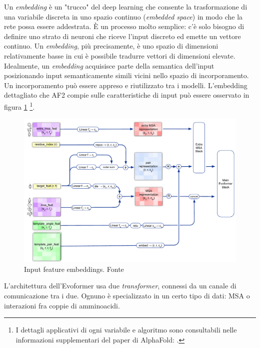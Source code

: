 \par Un \textit{embedding} è un "trucco" del deep learning che consente la trasformazione di una variabile discreta in uno spazio continuo (\textit{embedded space}) in modo che la rete possa essere addestrata. È un processo molto semplice: c'è solo bisogno di definire uno strato di neuroni che riceve l'input discreto ed emette un vettore continuo. Un \textit{embedding}, più precisamente, è uno spazio di dimensioni relativamente basse in cui è possibile tradurre vettori di dimensioni elevate.  Idealmente, un \textit{embedding} acquisisce parte della semantica dell'input posizionando input semanticamente simili vicini nello spazio di incorporamento.  Un incorporamento può essere appreso e riutilizzato tra i modelli. L'embedding dettagliato che AF2 compie sulle caratteristiche di input può essere osservato in figura \ref{fig:af2-emebddings} \footnote{I dettagli applicativi di ogni variabile e algoritmo sono consultabili nelle informazioni supplementari del paper di AlphaFold: .}.

\begin{figure}[!htb]
	\centering
	\includegraphics[scale=0.46]{images/af2-input-embeddings.png}
	\caption{Input feature embeddings. Fonte\cite{supplementaryjumper2021highly}}
	\label{fig:af2-emebddings}
\end{figure}

L'architettura dell'Evoformer usa due \textit{transformer}, connessi da un canale di comunicazione tra i due. Ognuno è specializzato in un certo tipo di dati: MSA o interazioni fra coppie di amminoacidi. 

